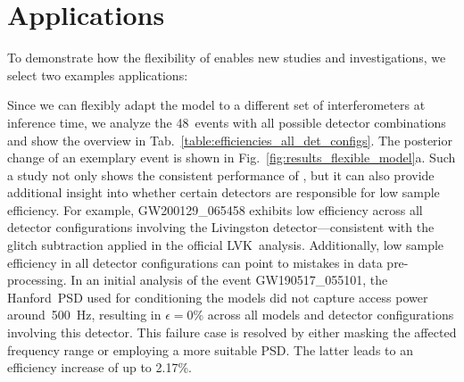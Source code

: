 \section{Applications}
To demonstrate how the flexibility of \dingoT enables new studies and investigations, we select two examples applications:

Since we can flexibly adapt the \dingoT model to a different set of interferometers at inference time, we analyze the 48~events with all possible detector combinations and show the overview in Tab.~\ref{table:efficiencies_all_det_configs}. The posterior change of an exemplary event is shown in Fig.~\ref{fig:results_flexible_model}a.
Such a study not only shows the consistent performance of \dingoT, but it can also provide additional insight into whether certain detectors are responsible for low sample efficiency.
For example, GW200129\_065458 exhibits low efficiency across all detector configurations involving the Livingston detector---consistent with the glitch subtraction applied in the official LVK~analysis.
Additionally, low sample efficiency in all detector configurations can point to mistakes in data pre-processing.
In an initial analysis of the event GW190517\_055101, the Hanford~PSD used for conditioning the \dingo models did not capture access power around~\SI{500}{\hertz}, resulting in $\epsilon = 0\%$ across all models and detector configurations involving this detector.
This failure case is resolved by either masking the affected frequency range or employing a more suitable PSD. The latter leads to an efficiency increase of up to 2.17\%.

